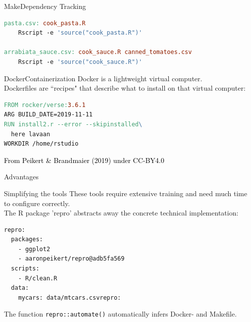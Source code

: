 \documentclass[12pt,t]{beamer}
\begin{document}
{\begin{frame}[c, fragile]{Make\textemdash{}Dependency Tracking}
\begin{lstlisting}[language=make,basicstyle=\ttfamily\scriptsize]
pasta.csv: cook_pasta.R
    Rscript -e 'source("cook_pasta.R")'

arrabiata_sauce.csv: cook_sauce.R canned_tomatoes.csv
    Rscript -e 'source("cook_sauce.R")'
\end{lstlisting}
\end{frame}

\begin{frame}[c, fragile]{Docker\textemdash{}Containerization}
	Docker is a lightweight virtual computer.\\
	Dockerfiles are ``recipes" that describe what to install on that virtual computer:
	\vspace{10mm}
	\begin{lstlisting}[language=make,basicstyle=\ttfamily\scriptsize]
FROM rocker/verse:3.6.1
ARG BUILD_DATE=2019-11-11
RUN install2.r --error --skipinstalled\
  here lavaan
WORKDIR /home/rstudio
\end{lstlisting}
\end{frame}

  \begin{frame}[plain]
  \vspace{8cm}
  \scriptsize \hfill{}\textcolor{black}{From Peikert \& Brandmaier (2019) under CC-BY4.0}
  \end{frame}
}

\begin{frame}[c]{Advantages}
	\begin{center}
	\end{center}
\end{frame}

\begin{frame}[c, fragile]{Simplifying the tools}
\textcolor<2->{lolit}{These tools require extensive training and need much time to configure correctly.\\}
\onslide<2->The R package 'repro' abstracts away the concrete technical implementation:\\
\begin{lstlisting}[basicstyle=\ttfamily\scriptsize]
repro:
  packages:
    - ggplot2
    - aaronpeikert/repro@adb5fa569
  scripts:
    - R/clean.R
  data:
    mycars: data/mtcars.csvrepro:
\end{lstlisting}
The function \lstinline|repro::automate()| automatically infers Docker- and Makefile.
\end{frame}
\end{document}
